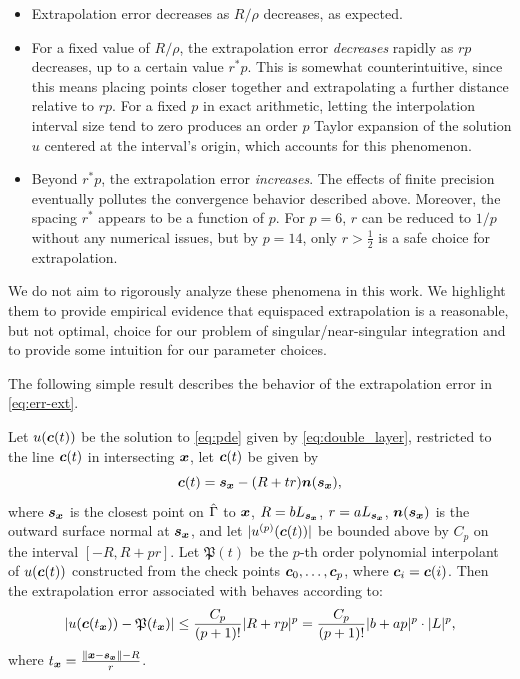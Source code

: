 \begin{itemize}
  \item Extrapolation error decreases as $R/\rho$ decreases, as expected.
  \item For a fixed value of $R/\rho$, the extrapolation error \textit{decreases} rapidly as $rp$ decreases, up to a certain value $r^*p$.
This is somewhat counterintuitive, since this means placing points closer together and extrapolating a further distance relative to $rp$.
For a fixed $p$ in exact arithmetic, letting the interpolation interval size tend to zero produces an order $p$ Taylor expansion of the solution $u$ centered at the interval's origin, which accounts for this phenomenon.


  \item Beyond $r^*p$, the extrapolation error \textit{increases}.
    The effects of finite precision eventually pollutes the convergence behavior described above. 
    Moreover, the spacing $r^*$ appears to be a function of $p$.
    For $p=6$, $r$ can be reduced to $1/p$ without any numerical issues, but
    by $p=14$, only $r>\frac{1}{2}$ is a safe choice for extrapolation.
\end{itemize}
We do not aim to rigorously analyze these phenomena in this work. 
We highlight them to provide empirical evidence that equispaced extrapolation is a reasonable, but not optimal, choice for our problem of singular/near-singular integration and to provide some intuition for our parameter choices.

The following simple result describes the behavior of the extrapolation error in \cref{eq:err-ext}.
\begin{theorem}
    Let $u({\bm{c}}(t))$ be the solution to \cref{eq:pde} given by \cref{eq:double_layer}, restricted to the line ${\bm{c}}(t)$ in \threed intersecting ${\bm{x}}$, let ${\bm{c}}(t)$ be given by 
  \begin{equation}
    {\bm{c}}(t) = {\bm{s}_{\bm{x}}} - (R + tr){\bm{n}}({\bm{s}_{\bm{x}}}),
    \label{eq:check_point_param}
  \end{equation}
  where ${\bm{s}_{\bm{x}}}$ is the closest point on $\hat{\Gamma}$ to ${\bm{x}}$, $R=bL_{{\bm{s}_{\bm{x}}}}$, $r=aL_{{\bm{s}_{\bm{x}}}}$, ${\bm{n}}({\bm{s}_{\bm{x}}})$ is the outward surface normal at ${\bm{s}_{\bm{x}}}$, and let $|u^{(p)}({\bm{c}}(t))|$ be bounded above by $C_p$ on the interval $[-R, R+pr]$.
  Let $\mathfrak{P}(t)$ be the $p$-th order polynomial interpolant of $u({\bm{c}}(t))$ constructed from the check points ${\bm{c}}_0, \hdots, {\bm{c}}_p$, where ${\bm{c}}_i = {\bm{c}}(i)$. Then the extrapolation error associated with \qbkix behaves according to:
\begin{equation}
  |u({\bm{c}}(t_{\bm{x}})) - \mathfrak{P}(t_{\bm{x}})| \leq \frac{C_p}{(p+1)!}|R + rp|^p = \frac{C_p}{(p+1)!}|b+ap|^p\cdot | L|^p,
  \label{eq:extrap_err_init}
\end{equation}
where $t_{\bm{x}} = \frac{\|{\bm{x}} - {\bm{s}_{\bm{x}}}\| - R}{r}$.
\label{thm:extrap_error}
\end{theorem}

